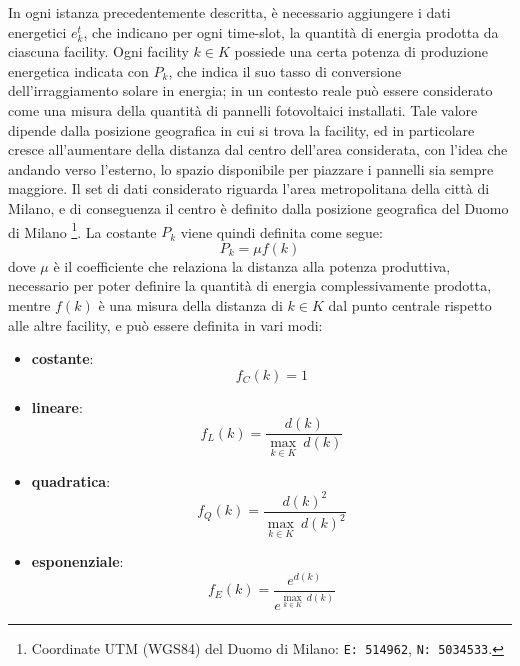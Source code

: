 In ogni istanza precedentemente descritta, è necessario aggiungere i dati energetici $e^t_k$, che indicano per ogni time-slot, la quantità di energia prodotta da ciascuna facility. Ogni facility $k \in K$ possiede una certa potenza di produzione energetica indicata con $P_k$, che indica il suo tasso di conversione dell'irraggiamento solare in energia; in un contesto reale può essere considerato come una misura della quantità di pannelli fotovoltaici installati. Tale valore dipende dalla posizione geografica in cui si trova la facility, ed in particolare cresce all'aumentare della distanza dal centro dell'area considerata, con l'idea che andando verso l'esterno, lo spazio disponibile per piazzare i pannelli sia sempre maggiore. Il set di dati considerato riguarda l'area metropolitana della città di Milano, e di conseguenza il centro è definito dalla posizione geografica del Duomo di Milano \footnote{Coordinate UTM (WGS84) del Duomo di Milano: \texttt{E: 514962}, \texttt{N: 5034533}.}. La costante $P_k$ viene quindi definita come segue:
\begin{equation}
    P_k = \mu f(k)
\end{equation}
dove $\mu$ è il coefficiente che relaziona la distanza alla potenza produttiva, necessario per poter definire la quantità di energia complessivamente prodotta, mentre $f(k)$ è una misura della distanza di $k \in K$ dal punto centrale rispetto alle altre facility, e può essere definita in vari modi:
\begin{itemize}
    \item \textbf{costante}:
    \begin{equation}
        f_C(k) = 1
        \label{eq:fC}
    \end{equation}

    \item \textbf{lineare}:
    \begin{equation}
        f_L(k) = \frac{d(k)}{\underset{k \in K}{\max} ~ d(k)}
        \label{eq:fL}
    \end{equation}

    \item \textbf{quadratica}:
    \begin{equation}
        f_Q(k) = \frac{d(k)^2}{\underset{k \in K}{\max} ~ d(k)^2}
        \label{eq:fQ}
    \end{equation}

    \item \textbf{esponenziale}:
    \begin{equation}
        f_E(k) = \frac{e^{d(k)}}{e^{\underset{k \in K}{\max} ~ d(k)}}
        \label{eq:fE}
    \end{equation}
\end{itemize}
